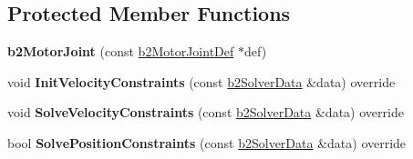 \subsection*{Protected Member Functions}
\begin{DoxyCompactItemize}
\item 
\mbox{\label{classb2MotorJoint_ac0c56b069910915e1ceef3b89c035833}} 
{\bfseries b2\+Motor\+Joint} (const \mbox{\hyperlink{structb2MotorJointDef}{b2\+Motor\+Joint\+Def}} $\ast$def)
\item 
\mbox{\label{classb2MotorJoint_aeffac9d1e3940c362962319d1bdb3f22}} 
void {\bfseries Init\+Velocity\+Constraints} (const \mbox{\hyperlink{structb2SolverData}{b2\+Solver\+Data}} \&data) override
\item 
\mbox{\label{classb2MotorJoint_a620c75b301aeab409f9d50a041a80fb8}} 
void {\bfseries Solve\+Velocity\+Constraints} (const \mbox{\hyperlink{structb2SolverData}{b2\+Solver\+Data}} \&data) override
\item 
\mbox{\label{classb2MotorJoint_a4e56455ab7e90f82fc1f463efc9b59de}} 
bool {\bfseries Solve\+Position\+Constraints} (const \mbox{\hyperlink{structb2SolverData}{b2\+Solver\+Data}} \&data) override
\end{DoxyCompactItemize}
